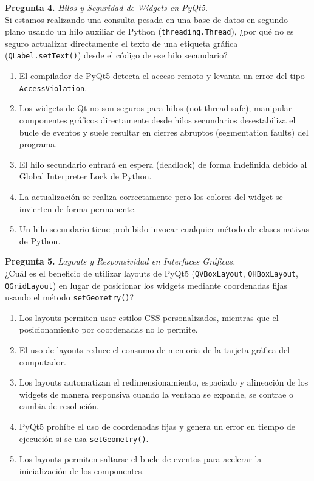 \documentclass[12pt,letterpaper]{article}
\begin{document}
\bigskip

\textbf{Pregunta 4.} \textit{Hilos y Seguridad de Widgets en PyQt5.} \\
Si estamos realizando una consulta pesada en una base de datos en segundo plano usando un hilo auxiliar de Python (\texttt{threading.Thread}), ¿por qué no es seguro actualizar directamente el texto de una etiqueta gráfica (\texttt{QLabel.setText()}) desde el código de ese hilo secundario?
\begin{enumerate}[label=\alph*)]
  \item El compilador de PyQt5 detecta el acceso remoto y levanta un error del tipo \texttt{AccessViolation}.
  \item Los widgets de Qt no son seguros para hilos (not thread-safe); manipular componentes gráficos directamente desde hilos secundarios desestabiliza el bucle de eventos y suele resultar en cierres abruptos (segmentation faults) del programa.
  \item El hilo secundario entrará en espera (deadlock) de forma indefinida debido al Global Interpreter Lock de Python.
  \item La actualización se realiza correctamente pero los colores del widget se invierten de forma permanente.
  \item Un hilo secundario tiene prohibido invocar cualquier método de clases nativas de Python.
\end{enumerate}

\bigskip

\textbf{Pregunta 5.} \textit{Layouts y Responsividad en Interfaces Gráficas.} \\
¿Cuál es el beneficio de utilizar layouts de PyQt5 (\texttt{QVBoxLayout}, \texttt{QHBoxLayout}, \texttt{QGridLayout}) en lugar de posicionar los widgets mediante coordenadas fijas usando el método \texttt{setGeometry()}?
\begin{enumerate}[label=\alph*)]
  \item Los layouts permiten usar estilos CSS personalizados, mientras que el posicionamiento por coordenadas no lo permite.
  \item El uso de layouts reduce el consumo de memoria de la tarjeta gráfica del computador.
  \item Los layouts automatizan el redimensionamiento, espaciado y alineación de los widgets de manera responsiva cuando la ventana se expande, se contrae o cambia de resolución.
  \item PyQt5 prohíbe el uso de coordenadas fijas y genera un error en tiempo de ejecución si se usa \texttt{setGeometry()}.
  \item Los layouts permiten saltarse el bucle de eventos para acelerar la inicialización de los componentes.
\end{enumerate}
\end{document}
